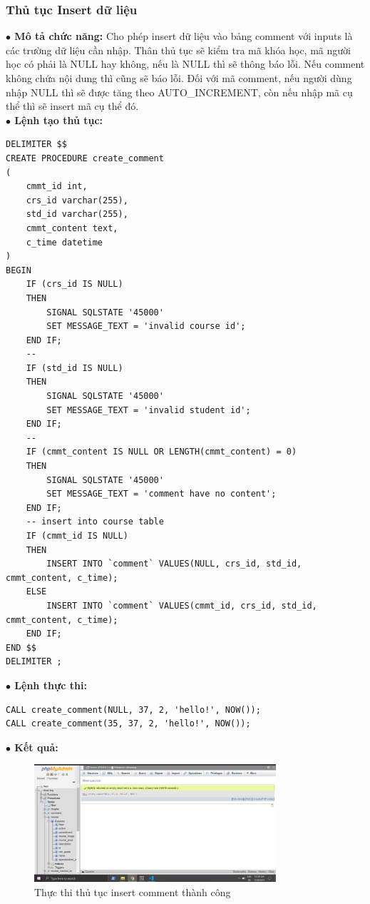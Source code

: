 \documentclass[12pt,a4paper,titlepage]{article}
\begin{document}
\subsubsection{Thủ tục Insert dữ liệu}
\textbf{$\bullet$ Mô tả chức năng:} Cho phép insert dữ liệu vào bảng comment với inputs là các trường dữ liệu cần nhập. Thân thủ tục sẽ kiểm tra mã khóa học, mã người học có phải là NULL hay không, nếu là NULL thì sẽ thông báo lỗi. Nếu comment không chứa nội dung thì cũng sẽ báo lỗi. Đối với mã comment, nếu người dùng nhập NULL thì sẽ được tăng theo AUTO_INCREMENT, còn nếu nhập mã cụ thể thì sẽ insert mã cụ thể đó.\\
\textbf{$\bullet$ Lệnh tạo thủ tục:}
\begin{lstlisting}
DELIMITER $$
CREATE PROCEDURE create_comment
(
	cmmt_id int,
	crs_id varchar(255),
	std_id varchar(255),
	cmmt_content text,
    c_time datetime
)
BEGIN
	IF (crs_id IS NULL)
	THEN
		SIGNAL SQLSTATE '45000'
		SET MESSAGE_TEXT = 'invalid course id';
	END IF;
	--
	IF (std_id IS NULL)
	THEN
		SIGNAL SQLSTATE '45000'
		SET MESSAGE_TEXT = 'invalid student id';
	END IF;
	--
	IF (cmmt_content IS NULL OR LENGTH(cmmt_content) = 0)
	THEN
		SIGNAL SQLSTATE '45000'
		SET MESSAGE_TEXT = 'comment have no content';
	END IF;
	-- insert into course table
	IF (cmmt_id IS NULL)
	THEN
		INSERT INTO `comment` VALUES(NULL, crs_id, std_id, cmmt_content, c_time);
	ELSE
		INSERT INTO `comment` VALUES(cmmt_id, crs_id, std_id, cmmt_content, c_time);
	END IF;
END $$
DELIMITER ;
\end{lstlisting}
\textbf{$\bullet$ Lệnh thực thi:}
\begin{lstlisting}
CALL create_comment(NULL, 37, 2, 'hello!', NOW());
CALL create_comment(35, 37, 2, 'hello!', NOW());
\end{lstlisting}
\textbf{$\bullet$ Kết quả:}
\begin{figure}[h!]
	\centering
	\caption{Thực thi thủ tục insert comment thành công}
	\includegraphics[width=0.8\textwidth]{images/cmmt1.png}
\end{figure}
\end{document}
